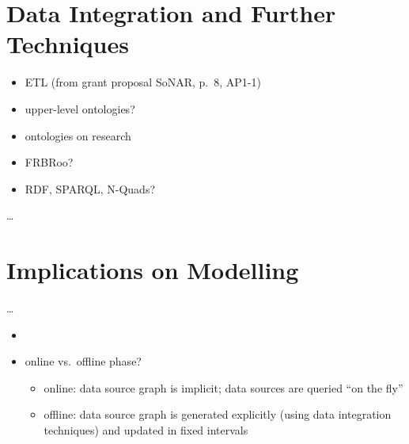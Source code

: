 \section{Data Integration and Further Techniques}
\label{sec:data_integration}

\begin{itemize}
  \item 
    ETL (from grant proposal \gls{SoNAR}, p.~8, AP1-1)
  \item
    upper-level ontologies?
  \item 
    ontologies on research
  \item
    FRBRoo?
  \item
    RDF, SPARQL, N-Quads?
\end{itemize}


\dots

\section{Implications on Modelling}
\label{sec:implications_on_modelling}

\dots

\begin{itemize}
  \item
  \item 
    online vs.\ offline phase?
    \begin{itemize}
      \item
        online: data source graph is implicit; data sources are queried \enquote{on the fly}
      \item
        offline: data source graph is generated explicitly (using data integration techniques)
        and updated in fixed intervals
    \end{itemize}
\end{itemize}


